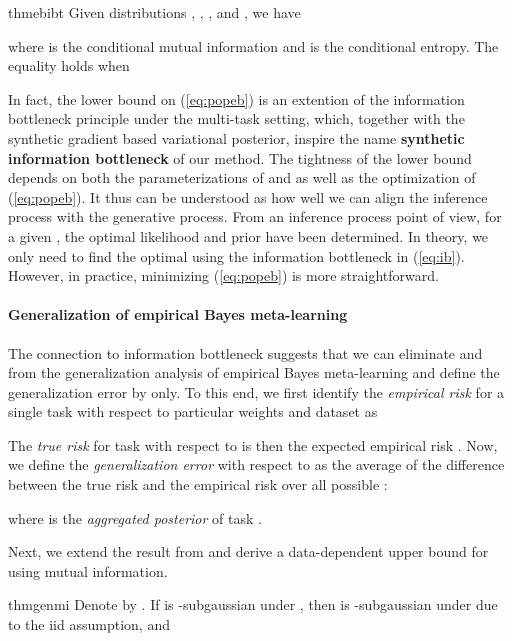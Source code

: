 \documentclass{article} \usepackage{iclr2020_conference,times}
\def\eqref#1{(\ref{#1})}
\begin{document}
\begin{restatable*}{thm}{ebibt}
    \label{thm:ib}
    Given distributions , , ,  and , we have

    where  is the conditional mutual information
    and  is the conditional entropy.
The equality holds when 
    
\end{restatable*}
In fact, the lower bound on \eqref{eq:popeb} is an extention of the information bottleneck principle \citep{Achille17} under the multi-task setting,
which, together with the synthetic gradient based variational posterior, 
    inspire the name \textbf{synthetic information bottleneck} of our method.
The tightness of the lower bound depends on both 
the parameterizations of  and  
as well as the optimization of \eqref{eq:popeb}.
It thus can be understood as how well we can align the inference process with the generative process.
    From an inference process point of view, for a given , the optimal likelihood and prior have been determined.
    In theory, we only need to find the optimal  using the information bottleneck in \eqref{eq:ib}.
    However, in practice, minimizing \eqref{eq:popeb} is more straightforward.

\paragraph{Generalization of empirical Bayes meta-learning}
    The connection to information bottleneck suggests that we can eliminate  and  from 
    the generalization analysis of empirical Bayes meta-learning and define the generalization error by  only.
    To this end, we first identify the \emph{empirical risk} for a single task  with respect to particular weights  and dataset  as 

    The \emph{true risk} for task  with respect to  is then the expected empirical risk .
    Now, we define the \emph{generalization error} with respect to  as 
    the average of the difference between the true risk and the empirical risk over all possible :

where  is the \emph{aggregated posterior} of task .

Next, we extend the result from \citet{xu2017information} and derive a data-dependent upper bound for  using mutual information.
\begin{restatable*}{thm}{genmi}
    Denote by .
    If  is -subgaussian under , 
then  is -subgaussian under  due to the iid assumption, and
    
\end{restatable*}
\end{document}
